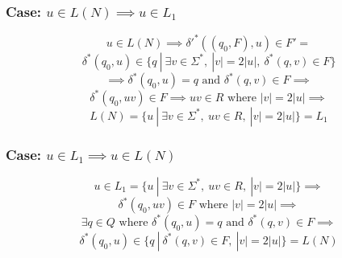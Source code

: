 \documentclass[12pt]{article}
\begin{document}
  \subsubsection*{Case: $u \in L(N) \implies u \in L_1$}
  $$ u \in L(N) \implies \delta{'}^*((q_0, F), u) \in F' = $$
  $$ \delta^*(q_0, u) \in \{q \:|\: \exists v \in \Sigma^* ,\:
  |v| = 2|u| ,\: \delta^*(q,v) \in F\}$$
  $$\implies \delta^*(q_0, u) = q \text{ and } \delta^*(q,v) \in F \implies$$
  $$\delta^*(q_0, uv) \in F \implies uv \in R \text{ where }|v|= 2|u| \implies$$
  $$L(N)=\{u \:|\: \exists v \in \Sigma^* ,\: uv \in R ,\: |v| = 2|u|\}=L_1$$
  \subsubsection*{Case: $u \in L_1 \implies u \in L(N)$}
  $$u \in L_1 = \{u \:|\: \exists v \in \Sigma^* ,\: uv \in R ,\: |v| = 2|u|\}
  \implies$$ $$\delta^*(q_0, uv) \in F  \text{ where } |v| = 2|u| \implies$$
  $$\exists q \in Q \text{ where } \delta^*(q_0, u) = q \text { and }
  \delta^*(q, v) \in F \implies$$
  $$\delta^*(q_0, u) \in \{q \:|\: \delta^*(q,v) \in F ,\: |v| = 2|u|\}= L(N)$$
\end{document}
